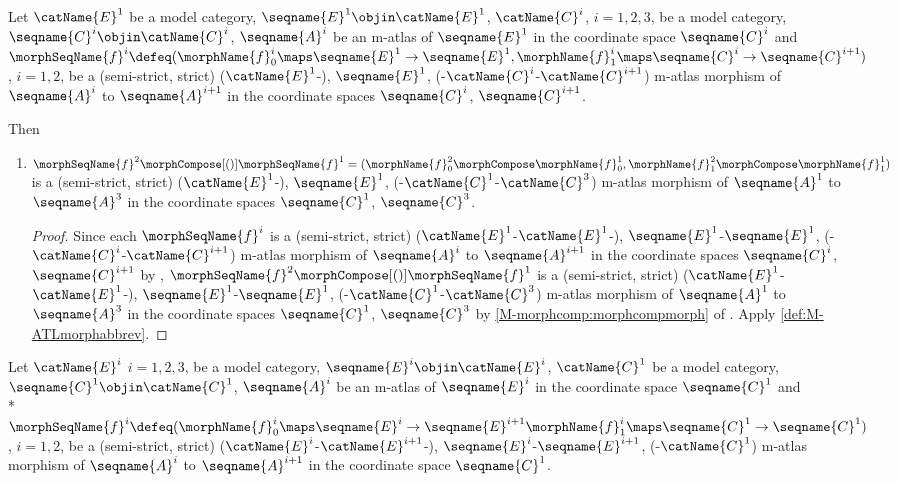 \documentclass{article}
\begin{document}
\begin{corollary}
\label{cor:M-ATLmorphcomp}
Let $\catName{E}^1$ be a model category,
$\seqname{E}^1 \objin \catName{E}^1$,
$\catName{C}^i$, $i=1,2,3$, be a model category,
$\seqname{C}^i \objin \catName{C}^i$, $\seqname{A}^i$ be an m-atlas of
$\seqname{E}^1$ in the coordinate space $\seqname{C}^i$ and
$
  \morphSeqName{f}^i \defeq
    (
      \morphName{f}^i_0 \maps \seqname{E}^1 \to \seqname{E}^1,
      \morphName{f}^i_1 \maps \seqname{C}^i \to \seqname{C}^{i+1}
    )
$, $i=1,2$,
be a (semi-strict, strict)
\nobreaks
  {
    {($\catName{E}^1$-)},
    {$\seqname{E}^1$},
    {(-$\catName{C}^i$-$\catName{C}^{i+1}$)}
  }
m-atlas morphism of
$\seqname{A}^i$ to $\seqname{A}^{i+1}$ in the coordinate spaces
$\seqname{C}^i$, $\seqname{C}^{i+1}$.

Then

\begin{enumerate}
\item
$
  \morphSeqName{f}^2 \morphCompose[()] \morphSeqName{f}^1 =
    (
      \morphName{f}^2_0 \morphCompose \morphName{f}^1_0,
      \morphName{f}^2_1 \morphCompose \morphName{f}^1_1
    )
$
is a (semi-strict, strict)
\nobreaks
  {
    {($\catName{E}^1$-)},
    {$\seqname{E}^1$},
    {(-$\catName{C}^1$-$\catName{C}^3$)}
  }
m-atlas morphism of $\seqname{A}^1$ to $\seqname{A}^3$ in the
coordinate spaces $\seqname{C}^1$, $\seqname{C}^3$.

\begin{proof}
Since each $\morphSeqName{f}^i$ is a (semi-strict, strict)
\nobreaks
  {
    {($\catName{E}^1$-$\catName{E}^1$-)},
    {$\seqname{E}^1$-$\seqname{E}^1$},
    {(-$\catName{C}^i$-$\catName{C}^{i+1}$)}
  }
m-atlas morphism of
$\seqname{A}^i$ to $\seqname{A}^{i+1}$ in the coordinate spaces
$\seqname{C}^i$, $\seqname{C}^{i+1}$ by
,
$\morphSeqName{f}^2 \morphCompose[()] \morphSeqName{f}^1$ is a (semi-strict,
strict)
\nobreaks
  {
    {($\catName{E}^1$-$\catName{E}^1$-)},
    {$\seqname{E}^1$-$\seqname{E}^1$},
    {(-$\catName{C}^1$-$\catName{C}^3$)}
  }
m-atlas morphism of
$\seqname{A}^1$ to $\seqname{A}^3$ in the coordinate spaces
$\seqname{C}^1$, $\seqname{C}^3$ by \cref{M-morphcomp:morphcompmorph} of
{
  \showlabelsinline
  .
}
Apply \cref{def:M-ATLmorphabbrev}.
\end{proof}
\end{enumerate}

Let $\catName{E}^i$ $i=1,2,3$, be a model category,
$\seqname{E}^i \objin \catName{E}^i$,
$\catName{C}^1$ be a model category,
$\seqname{C}^1 \objin \catName{C}^1$, $\seqname{A}^i$ be an m-atlas of
$\seqname{E}^i$ in the coordinate space $\seqname{C}^1$ and \\*
\nobreaks
  {{
    $
      \morphSeqName{f}^i \defeq
        (
          \morphName{f}^i_0 \maps \seqname{E}^i \to \seqname{E}^{i+1}
          \morphName{f}^i_1 \maps \seqname{C}^1 \to \seqname{C}^1
        )
    $,
  }}
$i=1,2$,
be a (semi-strict, strict)
\nobreaks
  {
    {($\catName{E}^i$-$\catName{E}^{i+1}$-)},
    {$\seqname{E}^i$-$\seqname{E}^{i+1}$},
    {(-$\catName{C}^1$)}
  }
m-atlas morphism of
$\seqname{A}^i$ to $\seqname{A}^{i+1}$ in the coordinate space
$\seqname{C}^1$.


\end{corollary}
\end{document}
